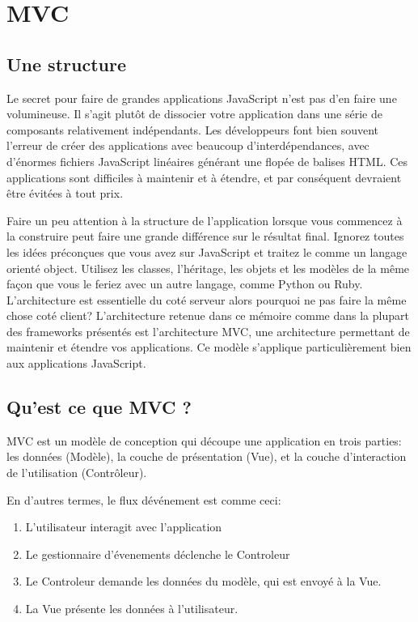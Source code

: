 \section{MVC}
\label{ch:mvc}

\subsection{Une structure}


Le secret pour faire de grandes applications JavaScript n’est pas d'en faire une volumineuse. Il s'agit plutôt de dissocier votre application dans une série de composants relativement indépendants. Les développeurs font bien souvent l’erreur de créer des applications avec beaucoup d’interdépendances, avec d’énormes fichiers JavaScript linéaires générant une flopée de balises HTML. Ces applications sont difficiles à maintenir et à étendre, et par conséquent devraient être évitées à tout prix.

Faire un peu attention à la structure de l'application lorsque vous commencez à la construire peut faire une grande différence sur le résultat final. Ignorez toutes les idées préconçues que vous avez sur JavaScript et traitez le comme un langage orienté object. Utilisez les classes, l’héritage, les objets et les modèles de la même façon que vous le feriez avec un autre langage, comme Python ou Ruby. L’architecture est essentielle du coté serveur alors pourquoi ne pas faire la même chose coté client? L’architecture retenue dans ce mémoire comme dans la plupart des frameworks présentés est l’architecture MVC, une architecture permettant de maintenir et étendre vos applications. Ce modèle s’applique particulièrement bien aux applications JavaScript.

\subsection{Qu’est ce que MVC ?}


MVC est un modèle de conception qui découpe une application en trois parties: les données (Modèle), la couche de présentation (Vue), et la couche d’interaction de l’utilisation (Contrôleur).

En d’autres termes, le flux dévénement est comme ceci:

\begin{enumerate}

  \item
  L’utilisateur interagit avec l’application

  \item
  Le gestionnaire d’évenements déclenche le Controleur

  \item
  Le Controleur demande les données du modèle, qui est envoyé à la Vue.

  \item
  La Vue présente les données à l’utilisateur.

\end{enumerate}

